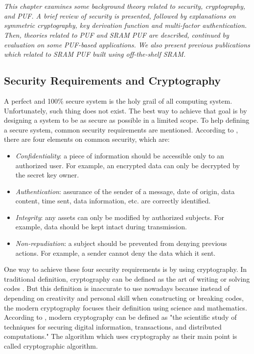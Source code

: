 \chapter{\chapterTwo}
\label{chp:2}

\textit{This chapter examines some background theory related to security, cryptography, and PUF. A brief review of security is presented, followed by explanations on symmetric cryptography, key derivation function and multi-factor authentication.
Then, theories related to PUF and SRAM PUF are described, continued by evaluation on some PUF-based applications. We also present previous publications which related to SRAM PUF built using off-the-shelf SRAM.}

\section{Security Requirements and Cryptography}
\label{chapter2.1}

A perfect and 100\% secure system is the holy grail of all computing system. Unfortunately, such thing does not exist. The best way to achieve that goal is by designing a system to be as secure as possible in a limited scope.
To help defining a secure system, common security requirements are mentioned.
According to \cite{cryptography_decrypted}, there are four elements on common security, which are:
\begin{itemize}
  \item \textit{Confidentiality}: a piece of information should be accessible only to an authorized user. For example, an encrypted data can only be decrypted by the secret key owner.
  \item \textit{Authentication}: assurance of the sender of a message, date of origin, data content, time sent, data information, etc. are correctly identified.
  \item \textit{Integrity}: any assets can only be modified by authorized subjects. For example, data should be kept intact during transmission.
  \item \textit{Non-repudiation}: a subject should be prevented from denying previous actions. For example, a sender cannot deny the data which it sent.
\end{itemize}

One way to achieve these four security requirements is by using cryptography. In traditional definition, cryptography can be defined as the art of writing or solving codes \cite{Oxford_dictionary}. But this definition is inaccurate to use nowadays because instead of depending on creativity and personal skill when constructing or breaking codes, the modern cryptography focuses their definition using science and mathematics. According to \cite{modern_cryptography}, modern cryptography can be defined as "the scientific study of techniques for securing digital information, transactions, and distributed computations." The algorithm which uses cryptography as their main point is called cryptographic algorithm.

